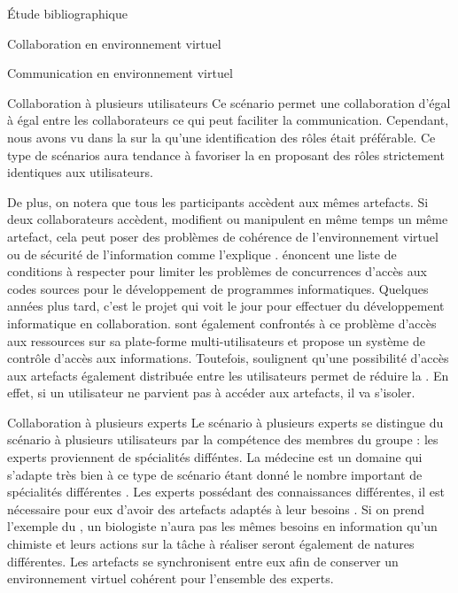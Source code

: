 \documentclass[myfrancais,ngerman,english,frenchb]{mythesis}
\begin{document}
\begin{mychapter}{Étude bibliographique}
\begin{mysection}{Collaboration en environnement virtuel}
\begin{mysubsection}{Communication en environnement virtuel}
\begin{mysubsubsection}{Collaboration à plusieurs utilisateurs}
					Ce scénario permet une collaboration d'égal à égal entre les collaborateurs ce qui peut faciliter la communication.
					Cependant, nous avons vu dans la  sur la  qu'une identification des rôles était préférable.
					Ce type de scénarios aura tendance à favoriser la  en proposant des rôles strictement identiques aux utilisateurs.

					De plus, on notera que tous les participants accèdent aux mêmes artefacts.
					Si deux collaborateurs accèdent, modifient ou manipulent en même temps un même artefact, cela peut poser des problèmes de cohérence de l'environnement virtuel ou de sécurité de l'information comme l'explique .
					 énoncent une liste de conditions à respecter pour limiter les problèmes de concurrences d'accès aux codes sources pour le développement de programmes informatiques.
					Quelques années plus tard, c'est le projet  qui voit le jour pour effectuer du développement informatique en collaboration.
					 sont également confrontés à ce problème d'accès aux ressources sur sa plate-forme multi-utilisateurs \myMARE et propose un système de contrôle d'accès aux informations.
					Toutefois,  soulignent qu'une possibilité d'accès aux artefacts également distribuée entre les utilisateurs permet de réduire la .
					En effet, si un utilisateur ne parvient pas à accéder aux artefacts, il va s'isoler.
				\end{mysubsubsection}
				\begin{mysubsubsection}{Collaboration à plusieurs experts}
					Le scénario à plusieurs experts se distingue du scénario à plusieurs utilisateurs par la compétence des membres du groupe : les experts proviennent de spécialités difféntes.
					La médecine est un domaine qui s'adapte très bien à ce type de scénario étant donné le nombre important de spécialités différentes .
					Les experts possédant des connaissances différentes, il est nécessaire pour eux d'avoir des artefacts adaptés à leur besoins .
					Si on prend l'exemple du , un biologiste n'aura pas les mêmes besoins en information qu'un chimiste et leurs actions sur la tâche à réaliser seront également de natures différentes.
					Les artefacts se synchronisent entre eux afin de conserver un environnement virtuel cohérent pour l'ensemble des experts.


\end{mysubsubsection}
\end{mysubsection}
\end{mysection}
\end{mychapter}
\end{document}
